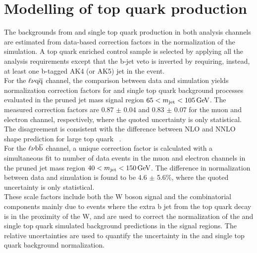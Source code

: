 \section{Modelling of top quark production}\label{sec:ttbar}

The backgrounds from \ttbar and single top quark production in both analysis channels are estimated from data-based correction factors in the normalization of the simulation.
A top quark enriched control sample is selected by applying all the analysis requirements except that the b-jet veto is inverted by requiring, instead, at least one b-tagged AK4 (or AK5) jet in the event.\\

For the $\ell\nu\mathrm{q}\overline{\mathrm{q}}$ channel, the comparison between data and simulation yields normalization correction factors for \ttbar and single top quark background processes evaluated in the pruned jet mass signal region
$65 < m_{\text{jet}} < 105\,\text{Ge\hspace{-.08em}V}$. The measured correction factors are 0.87 $\pm$ 0.04 and 0.83 $\pm$ 0.07 for the muon and electron channel, respectively, where the quoted uncertainty is only statistical.
The disagreement is consistent with the difference between NLO and NNLO shape prediction for large top quark \pt~\cite{Czakon:2015owf}.\\

For the $\ell\nu{\mathrm{b}\overline{\mathrm{b}}}$ channel, a unique correction factor is calculated with a simultaneous fit to number of data events in the muon and electron channels in the pruned jet mass region $40 < m_{\text{jet}} < 150\,\text{Ge\hspace{-.08em}V}$.
The difference in normalization between data and simulation is found to be 4.6 $\pm$ 5.6\%, where the quoted uncertainty is only statistical. \\

These scale factors include both the W boson signal and the combinatorial components mainly due to events where the extra b jet from the top quark decay is in the proximity of the W, and are used to correct the normalization
of the \ttbar and single top quark simulated background predictions in the signal regions. The relative uncertainties are used to quantify the uncertainty in the \ttbar and single top quark background normalization.

